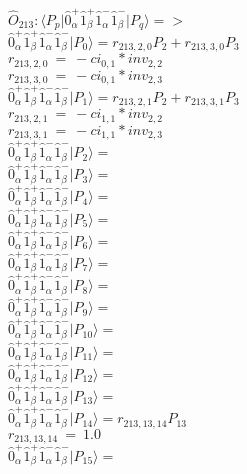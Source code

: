 \documentclass[14pt]{article}
\begin{document}
    $\hat{O}_{213}:  \langle{P_p}\vert \hat{0}_{\alpha}^{+}\hat{1}_{\beta}^{+}\hat{1}_{\alpha}^{-}\hat{1}_{\beta}^{-} \vert{P_q}\rangle => $ \\ 
    $ \hat{0}_{\alpha}^{+}\hat{1}_{\beta}^{+}\hat{1}_{\alpha}^{-}\hat{1}_{\beta}^{-} \vert{P_{0}}\rangle = {r}_{213,2,0}P_{2}+{r}_{213,3,0}P_{3} $ \\ 
    ${r}_{213,2,0}\ =\ -{ci}_{0,1}*{inv}_{2,2} $ \\ 
    ${r}_{213,3,0}\ =\ -{ci}_{0,1}*{inv}_{2,3} $ \\ 
    $ \hat{0}_{\alpha}^{+}\hat{1}_{\beta}^{+}\hat{1}_{\alpha}^{-}\hat{1}_{\beta}^{-} \vert{P_{1}}\rangle = {r}_{213,2,1}P_{2}+{r}_{213,3,1}P_{3} $ \\ 
    ${r}_{213,2,1}\ =\ -{ci}_{1,1}*{inv}_{2,2} $ \\ 
    ${r}_{213,3,1}\ =\ -{ci}_{1,1}*{inv}_{2,3} $ \\ 
    $ \hat{0}_{\alpha}^{+}\hat{1}_{\beta}^{+}\hat{1}_{\alpha}^{-}\hat{1}_{\beta}^{-} \vert{P_{2}}\rangle =  $ \\ 
    $ \hat{0}_{\alpha}^{+}\hat{1}_{\beta}^{+}\hat{1}_{\alpha}^{-}\hat{1}_{\beta}^{-} \vert{P_{3}}\rangle =  $ \\ 
    $ \hat{0}_{\alpha}^{+}\hat{1}_{\beta}^{+}\hat{1}_{\alpha}^{-}\hat{1}_{\beta}^{-} \vert{P_{4}}\rangle =  $ \\ 
    $ \hat{0}_{\alpha}^{+}\hat{1}_{\beta}^{+}\hat{1}_{\alpha}^{-}\hat{1}_{\beta}^{-} \vert{P_{5}}\rangle =  $ \\ 
    $ \hat{0}_{\alpha}^{+}\hat{1}_{\beta}^{+}\hat{1}_{\alpha}^{-}\hat{1}_{\beta}^{-} \vert{P_{6}}\rangle =  $ \\ 
    $ \hat{0}_{\alpha}^{+}\hat{1}_{\beta}^{+}\hat{1}_{\alpha}^{-}\hat{1}_{\beta}^{-} \vert{P_{7}}\rangle =  $ \\ 
    $ \hat{0}_{\alpha}^{+}\hat{1}_{\beta}^{+}\hat{1}_{\alpha}^{-}\hat{1}_{\beta}^{-} \vert{P_{8}}\rangle =  $ \\ 
    $ \hat{0}_{\alpha}^{+}\hat{1}_{\beta}^{+}\hat{1}_{\alpha}^{-}\hat{1}_{\beta}^{-} \vert{P_{9}}\rangle =  $ \\ 
    $ \hat{0}_{\alpha}^{+}\hat{1}_{\beta}^{+}\hat{1}_{\alpha}^{-}\hat{1}_{\beta}^{-} \vert{P_{10}}\rangle =  $ \\ 
    $ \hat{0}_{\alpha}^{+}\hat{1}_{\beta}^{+}\hat{1}_{\alpha}^{-}\hat{1}_{\beta}^{-} \vert{P_{11}}\rangle =  $ \\ 
    $ \hat{0}_{\alpha}^{+}\hat{1}_{\beta}^{+}\hat{1}_{\alpha}^{-}\hat{1}_{\beta}^{-} \vert{P_{12}}\rangle =  $ \\ 
    $ \hat{0}_{\alpha}^{+}\hat{1}_{\beta}^{+}\hat{1}_{\alpha}^{-}\hat{1}_{\beta}^{-} \vert{P_{13}}\rangle =  $ \\ 
    $ \hat{0}_{\alpha}^{+}\hat{1}_{\beta}^{+}\hat{1}_{\alpha}^{-}\hat{1}_{\beta}^{-} \vert{P_{14}}\rangle = {r}_{213,13,14}P_{13} $ \\ 
    ${r}_{213,13,14}\ =\ 1.0 $ \\ 
    $ \hat{0}_{\alpha}^{+}\hat{1}_{\beta}^{+}\hat{1}_{\alpha}^{-}\hat{1}_{\beta}^{-} \vert{P_{15}}\rangle =  $ \\ 
    
\end{document}
